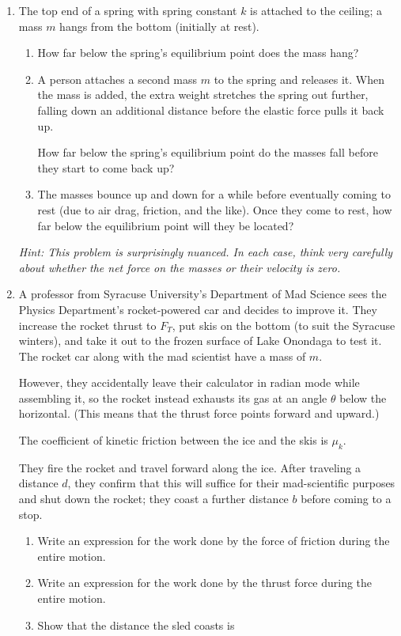 \documentclass[12pt]{article}
\begin{document}
\begin{enumerate}
\item The top end of a spring with spring constant $k$ is attached to the ceiling; a mass $m$ hangs from the bottom (initially at rest). 

\begin{enumerate}
	\item How far below the spring's equilibrium point does the mass hang?
	\item A person attaches a second mass $m$ to the spring and releases it. When the mass is added, the extra weight stretches the spring out further,
	falling down an additional distance before the elastic force pulls it back up.
	
	How far below the spring's equilibrium point do the masses fall before they start to come back up?
	
	\item The masses bounce up and down for a while before eventually
	coming to rest (due to air drag, friction, and the like).
	Once they come to rest, how far below the equilibrium point
	will they be located?
\end{enumerate}

{\it Hint: This problem is surprisingly nuanced. In each case, think very carefully about whether the net \rm{force} on the masses \it or their \rm{velocity} \it is zero.}

\bigskip

\item A professor from Syracuse University's Department of Mad Science sees the Physics Department's rocket-powered car and decides to improve it. They increase the rocket thrust to $F_T$, put skis on the bottom (to suit the Syracuse winters), and take it out to the frozen surface of Lake Onondaga to test it. The rocket car along with the mad scientist have a mass of $m$. 

However, they accidentally leave their calculator in radian mode while assembling it, so the rocket instead exhausts its gas at an angle $\theta$ below the horizontal. (This means that the thrust force points forward and upward.)

The coefficient of kinetic friction between the ice and the skis is $\mu_k$.

They fire the rocket and travel forward along the ice. After traveling a distance $d$, they confirm that this will suffice for their mad-scientific purposes and shut down the rocket; they coast a further distance $b$ before coming to a stop.

\begin{enumerate}
	\item Write an expression for the work done by the force of friction during the entire motion.
	\item Write an expression for the work done by the thrust force during the entire motion.
	\item Show that the distance the sled coasts is 
	

\end{enumerate}
\end{enumerate}
\end{document}
